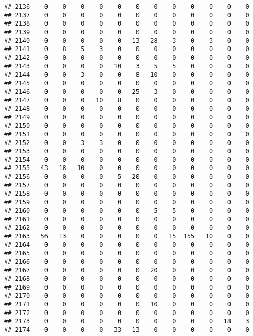 \documentclass[]{article}
\begin{document}
\begin{verbatim}
## 2136    0    0    0    0    0    0    0    0    0    0    0    0
## 2137    0    0    0    0    0    0    0    0    0    0    0    0
## 2138    0    0    0    0    0    0    0    0    0    0    0    0
## 2139    0    0    0    0    0    0    0    0    0    0    0    0
## 2140    0    0    0    0    0   13   28    3    0    3    0    0
## 2141    0    8    5    3    0    0    0    0    0    0    0    0
## 2142    0    0    0    0    0    0    0    0    0    0    0    0
## 2143    0    0    0    0   10    3    5    5    0    0    0    0
## 2144    0    0    3    0    0    8   10    0    0    0    0    0
## 2145    0    0    0    0    0    0    0    0    0    0    0    0
## 2146    0    0    0    0    0   25    3    0    0    0    0    0
## 2147    0    0    0   10    8    0    0    0    0    0    0    0
## 2148    0    0    0    0    0    0    0    0    0    0    0    0
## 2149    0    0    0    0    0    0    0    0    0    0    0    0
## 2150    0    0    0    0    0    0    0    0    0    0    0    0
## 2151    0    0    0    0    0    0    0    0    0    0    0    0
## 2152    0    0    3    3    0    0    0    0    0    0    0    0
## 2153    0    0    0    0    0    0    0    0    0    0    0    0
## 2154    0    0    0    0    0    0    0    0    0    0    0    0
## 2155   43   18   10    0    0    0    0    0    0    0    0    0
## 2156    0    0    0    0    5   20    0    0    0    0    0    0
## 2157    0    0    0    0    0    0    0    0    0    0    0    0
## 2158    0    0    0    0    0    0    0    0    0    0    0    0
## 2159    0    0    0    0    0    0    0    0    0    0    0    0
## 2160    0    0    0    0    0    0    5    5    0    0    0    0
## 2161    0    0    0    0    0    0    0    0    0    0    0    0
## 2162    0    0    0    0    0    0    0    0    0    0    0    0
## 2163   56   13    0    0    0    0    0   15  155   10    0    0
## 2164    0    0    0    0    0    0    0    0    0    0    0    0
## 2165    0    0    0    0    0    0    0    0    0    0    0    0
## 2166    0    0    0    0    0    0    0    0    0    0    0    0
## 2167    0    0    0    0    0    0   20    0    0    0    0    0
## 2168    0    0    0    0    0    0    0    0    0    0    0    0
## 2169    0    0    0    0    0    0    0    0    0    0    0    0
## 2170    0    0    0    0    0    0    0    0    0    0    0    0
## 2171    0    0    0    0    0    0   10    0    0    0    0    0
## 2172    0    0    0    0    0    0    0    0    0    0    0    0
## 2173    0    0    0    0    0    0    0    0    0    0   18    3
## 2174    0    0    0    0   33   13    0    0    0    0    0    0

\end{verbatim}
\end{document}

